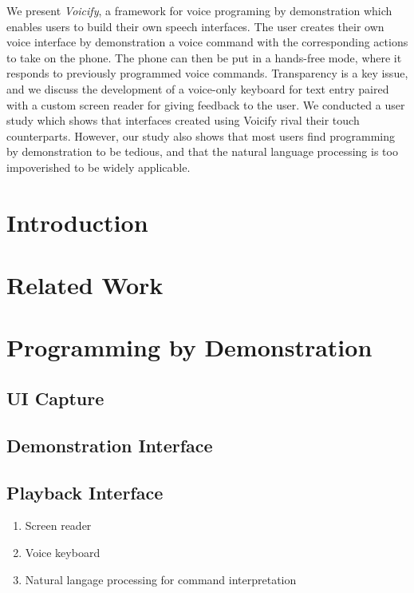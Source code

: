 \documentclass[letterpaper]{article}
\begin{document}
\abstract
We present \emph{Voicify}, a framework for voice programing by 
demonstration which enables users to build their own speech interfaces.
The user creates their own voice interface by demonstration a voice command with the corresponding
actions to take on the phone. The phone can then be put in a hands-free mode, where it
responds to previously programmed voice commands. 
Transparency is a key issue, and we discuss the development of a voice-only keyboard for
text entry paired with a custom screen reader for giving feedback to the user.
We conducted a user study which shows that
interfaces created using Voicify rival their touch counterparts.
However, our study also shows that most users find programming by demonstration to be
tedious, and that the natural language processing is too impoverished to be widely applicable.

\section{Introduction}

\section{Related Work}

\section{Programming by Demonstration}
\subsection{UI Capture}

\subsection{Demonstration Interface}

\subsection{Playback Interface}
\begin{enumerate}
\item Screen reader
\item Voice keyboard
\item Natural langage processing for command interpretation
\end{enumerate}
\end{document}
